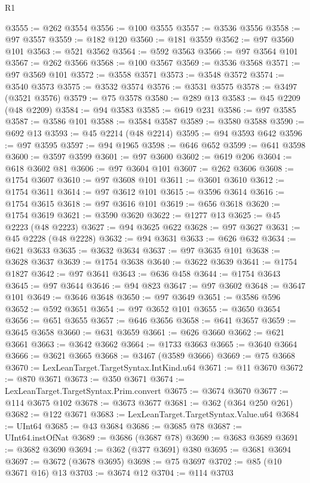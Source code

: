 \begin{lexlean}{R1}
\begin{coremodule}
@3555 := @262 @3554
@3556 := @100 @3555
@3557 := @3536 @3556
@3558 := @97 @3557
@3559 := @182 @120
@3560 := @181 @3559
@3562 := @97 @3560 @101
@3563 := @521 @3562
@3564 := @592 @3563
@3566 := @97 @3564 @101
@3567 := @262 @3566
@3568 := @100 @3567
@3569 := @3536 @3568
@3571 := @97 @3569 @101
@3572 := @3558 @3571
@3573 := @3548 @3572
@3574 := @3540 @3573
@3575 := @3532 @3574
@3576 := @3531 @3575
@3578 := @3497 (@3521 @3576)
@3579 := @75 @3578
@3580 := @289 @13
@3583 := @45 @2209 (@48 @2209)
@3584 := @94 @3583
@3585 := @619 @231
@3586 := @97 @3585
@3587 := @3586 @101
@3588 := @3584 @3587
@3589 := @3580 @3588
@3590 := @692 @13
@3593 := @45 @2214 (@48 @2214)
@3595 := @94 @3593 @642
@3596 := @97 @3595
@3597 := @94 @1965
@3598 := @646 @652
@3599 := @641 @3598
@3600 := @3597 @3599
@3601 := @97 @3600
@3602 := @619 @206
@3604 := @618 @3602 @81
@3606 := @97 @3604 @101
@3607 := @262 @3606
@3608 := @1754 @3607
@3610 := @97 @3608 @101
@3611 := @3601 @3610
@3612 := @1754 @3611
@3614 := @97 @3612 @101
@3615 := @3596 @3614
@3616 := @1754 @3615
@3618 := @97 @3616 @101
@3619 := @656 @3618
@3620 := @1754 @3619
@3621 := @3590 @3620
@3622 := @1277 @13
@3625 := @45 @2223 (@48 @2223)
@3627 := @94 @3625 @622
@3628 := @97 @3627
@3631 := @45 @2228 (@48 @2228)
@3632 := @94 @3631
@3633 := @626 @632
@3634 := @621 @3633
@3635 := @3632 @3634
@3637 := @97 @3635 @101
@3638 := @3628 @3637
@3639 := @1754 @3638
@3640 := @3622 @3639
@3641 := @1754 @1827
@3642 := @97 @3641
@3643 := @636 @458
@3644 := @1754 @3643
@3645 := @97 @3644
@3646 := @94 @823
@3647 := @97 @3602
@3648 := @3647 @101
@3649 := @3646 @3648
@3650 := @97 @3649
@3651 := @3586 @596
@3652 := @592 @3651
@3654 := @97 @3652 @101
@3655 := @3650 @3654
@3656 := @651 @3655
@3657 := @646 @3656
@3658 := @641 @3657
@3659 := @3645 @3658
@3660 := @631 @3659
@3661 := @626 @3660
@3662 := @621 @3661
@3663 := @3642 @3662
@3664 := @1733 @3663
@3665 := @3640 @3664
@3666 := @3621 @3665
@3668 := @3467 (@3589 @3666)
@3669 := @75 @3668
@3670 := LexLeanTarget.TargetSyntax.IntKind.u64
@3671 := @11 @3670
@3672 := @870 @3671
@3673 := @350 @3671
@3674 := LexLeanTarget.TargetSyntax.Prim.convert
@3675 := @3674 @3670
@3677 := @114 @3675 @102
@3678 := @3673 @3677
@3681 := @362 (@364 @250 @261)
@3682 := @122 @3671
@3683 := LexLeanTarget.TargetSyntax.Value.u64
@3684 := UInt64
@3685 := @43 @3684
@3686 := @3685 @78
@3687 := UInt64.instOfNat
@3689 := @3686 (@3687 @78)
@3690 := @3683 @3689
@3691 := @3682 @3690
@3694 := @362 (@377 @3691) @380
@3695 := @3681 @3694
@3697 := @3672 (@3678 @3695)
@3698 := @75 @3697
@3702 := @85 (@10 @3671 @16) @13
@3703 := @3674 @12
@3704 := @114 @3703

\end{coremodule}
\end{lexlean}
